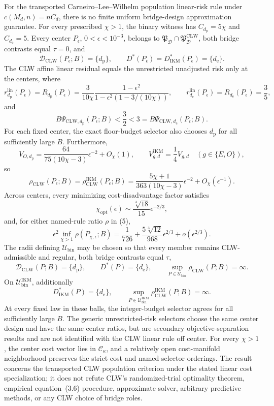 For the transported Carneiro--Lee--Wilhelm population linear-risk rule under \(c(M_d,n)=nC_d\), there is no finite uniform bridge-design approximation guarantee.  For every prescribed \(\chi>1\), the binary witness has \(C_{d_{\mathrm p}}=5\chi\) and \(C_{d_{\mathrm e}}=5\).  Every center \(P_\epsilon\), \(0<\epsilon<10^{-3}\), belongs to \(\mathfrak P_{\mathcal D}\cap\mathfrak P_{\mathcal D}^{\mathrm{CLW}}\), both bridge contrasts equal \(\tau=0\), and
\[
 \mathcal D_{\mathrm{CLW}}(P_\epsilon;B)=\{d_{\mathrm p}\},
 \qquad
 D^*(P_\epsilon)=D_{\mathrm{IKM}}^*(P_\epsilon)=\{d_{\mathrm e}\}. \tag{1}
\]
The CLW affine linear residual equals the unrestricted unadjusted risk only at the centers, where
\[
 r_{d_{\mathrm p}}^{\mathrm{lin}}(P_\epsilon)
 =R_{d_{\mathrm p}}(P_\epsilon)
 =\frac{3}{10\chi}\frac{1-\epsilon^2}{1-\epsilon^2(1-3/(10\chi))},
 \qquad
 r_{d_{\mathrm e}}^{\mathrm{lin}}(P_\epsilon)
 =R_{d_{\mathrm e}}(P_\epsilon)=\frac35,                   \tag{2}
\]
and
\[
 B\Psi_{\mathrm{CLW},d_{\mathrm p}}(P_\epsilon;B)
 <\frac32<3
 =B\Psi_{\mathrm{CLW},d_{\mathrm e}}(P_\epsilon;B).       \tag{3}
\]
For each fixed center, the exact floor-budget selector also chooses \(d_{\mathrm p}\) for all sufficiently large \(B\).  Furthermore,
\[
 V_{O,d_{\mathrm p}}
 =\frac{64}{75(10\chi-3)}\epsilon^{-2}+O_\chi(1),
 \qquad
 V_{g,d}^{\mathrm{IKM}}=\frac14V_{g,d}\quad(g\in\{E,O\}), \tag{4}
\]
so
\[
 \rho_{\mathrm{CLW}}(P_\epsilon;B)
 =\rho_{\mathrm{CLW}}^{\mathrm{IKM}}(P_\epsilon;B)
 =\frac{5\chi+1}{363(10\chi-3)}\epsilon^{-2}
 +O_\chi(\epsilon^{-1}).                                  \tag{5}
\]
Across centers, every minimizing cost-disadvantage factor satisfies
\[
 \chi_{\mathrm{opt}}(\epsilon)
 \sim\frac{\sqrt[3]{18}}{15}\epsilon^{-2/3},              \tag{6}
\]
and, for either named-rule ratio \(\rho\) in (5),
\[
 \epsilon^2\inf_{\chi>1}\rho(P_{\chi,\epsilon};B)
 =\frac1{726}+\frac{5\sqrt[3]{12}}{968}\epsilon^{2/3}
 +o(\epsilon^{2/3}).                                      \tag{7}
\]
The radii defining \(\mathcal U_{\mathrm{bin}}\) may be chosen so that every member remains CLW-admissible and regular, both bridge contrasts equal \(\tau\),
\[
 \mathcal D_{\mathrm{CLW}}(P;B)=\{d_{\mathrm p}\},
 \qquad D^*(P)=\{d_{\mathrm e}\},
 \qquad
 \sup_{P\in\mathcal U_{\mathrm{bin}}}\rho_{\mathrm{CLW}}(P;B)=\infty. \tag{8}
\]
On \(\mathcal U_{\mathrm{bin}}^{\mathrm{IKM}}\), additionally
\[
 D_{\mathrm{IKM}}^*(P)=\{d_{\mathrm e}\},
 \qquad
 \sup_{P\in\mathcal U_{\mathrm{bin}}^{\mathrm{IKM}}}
 \rho_{\mathrm{CLW}}^{\mathrm{IKM}}(P;B)=\infty.          \tag{9}
\]
At every fixed law in these balls, the integer-budget selector agrees for all sufficiently large \(B\).  The generic unrestricted-risk selectors choose the same center design and have the same center ratios, but are secondary objective-separation results and are not identified with the CLW linear rule off center.  For every \(\chi>1\), the center cost vector lies in \(\mathcal C_\kappa\), and a relatively open cost-manifold neighborhood preserves the strict cost and named-selector orderings.  The result concerns the transported CLW population criterion under the stated linear cost specialization; it does not refute CLW's randomized-trial optimality theorem, empirical equation~(3.6) procedure, approximate solver, arbitrary predictive methods, or any CLW choice of bridge roles.